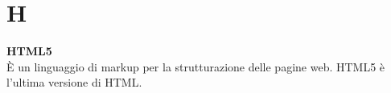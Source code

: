 \section{H}
\textbf{HTML5}\\
È un linguaggio di markup per la strutturazione delle pagine web. HTML5 è l’ultima versione di HTML.

\clearpage